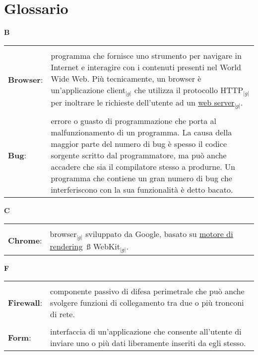 \appendix

\addappheadtotoc
\section{Glossario}\label{appendice}

\hfill\Huge{\textbf{B}}\\
\normalsize
	\begin{longtable}{p{} p{}} 
	    \toprule
	    \\
		    \textbf{Browser}:		&	programma che fornisce uno strumento per navigare in Internet e interagire con i contenuti presenti nel World Wide Web. Più tecnicamente, un browser è 
						un’applicazione client$_{|g|}$ che utilizza il protocollo HTTP$_{|g|}$ per inoltrare le richieste dell’utente ad un \underline{web server}$_{|g|}$.\\
	    \\
	    \textbf{Bug}:		&	errore o guasto di programmazione che porta al malfunzionamento di un programma. La causa della maggior parte del numero di bug è spesso il
						codice sorgente scritto dal programmatore, ma può anche accadere che sia il compilatore stesso a produrne. Un programma che contiene un gran numero
						di bug che interferiscono con la sua funzionalità è detto bacato.\\
	\end{longtable}

\hfill\Huge{\textbf{C}}\\	
\normalsize
	\begin{longtable}{p{} p{}} 
	    \toprule
	    \\
	  \textbf{Chrome}: &	browser$_{|g|}$ sviluppato da Google, basato su \underline{motore di rendering}\g~ß WebKit$_{|g|}$.\\
	
	\end{longtable}
	
\hfill\Huge{\textbf{F}}\\	
\normalsize
	\begin{longtable}{p{} p{}} 
	    \toprule
	    \\	
	\textbf{Firewall}: &	
	componente passivo di difesa perimetrale che può anche svolgere funzioni di collegamento tra due o più tronconi di rete.\\
	\\
	\textbf{Form}: &
	
	interfaccia di un'applicazione che consente all'utente di inviare uno o più dati liberamente inseriti da egli stesso.\\
	\end{longtable}
	
